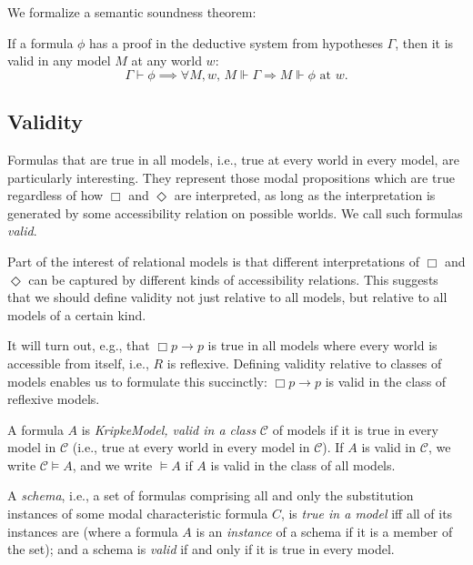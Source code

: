 We formalize a semantic soundness theorem:

\begin{theorem}
    \label{thm:semantic-soundness}
If a formula $\phi$ has a proof in the deductive system from hypotheses $\Gamma$, then it is valid in any model $M$ at any world $w$:
\[
\Gamma \vdash \phi \implies \forall M, w,\, M \Vdash \Gamma \Rightarrow M \Vdash \phi \text{ at } w.
\]
\end{theorem}

\subsection{Validity}

Formulas that are true in all models, i.e., true at every world in 
every model, are particularly interesting. They represent those modal 
propositions which are true regardless of how $\Box$ and $\Diamond$ are 
interpreted, as long as the interpretation is generated by some accessibility 
relation on possible worlds. We call such formulas \emph{valid}.

Part of the interest of relational models is that different interpretations 
of $\Box$ and $\Diamond$ can be captured by different kinds of accessibility 
relations. This suggests that we should define validity not just relative to 
all models, but relative to all models of a certain kind.

It will turn out, e.g., that $\Box p \to p$ is true in all models where every 
world is accessible from itself, i.e., $R$ is reflexive. Defining validity 
relative to classes of models enables us to formulate this succinctly: 
$\Box p \to p$ is valid in the class of reflexive models.

\begin{definition}
  \label{valid-in-class}
  A formula $A$ is \emph{KripkeModel, valid in a class} $\mathcal{C}$ 
of models if it is true in every model in $\mathcal{C}$ (i.e., true at every 
world in every model in $\mathcal{C}$). If $A$ is valid in $\mathcal{C}$, we 
write $\mathcal{C} \vDash A$, and we write $\vDash A$ if $A$ is valid in the 
class of all models.
\end{definition}

\begin{definition}
  \label{valid-schema}
A \emph{schema}, i.e., a set of formulas comprising all and 
only the substitution instances of some modal characteristic formula $C$, 
is \emph{true in a model} iff all of its instances are 
(where a formula $A$ is an \emph{instance} of a schema if it is a 
member of the set); and a schema is \emph{valid} if and only if it is 
true in every model.
\end{definition}


